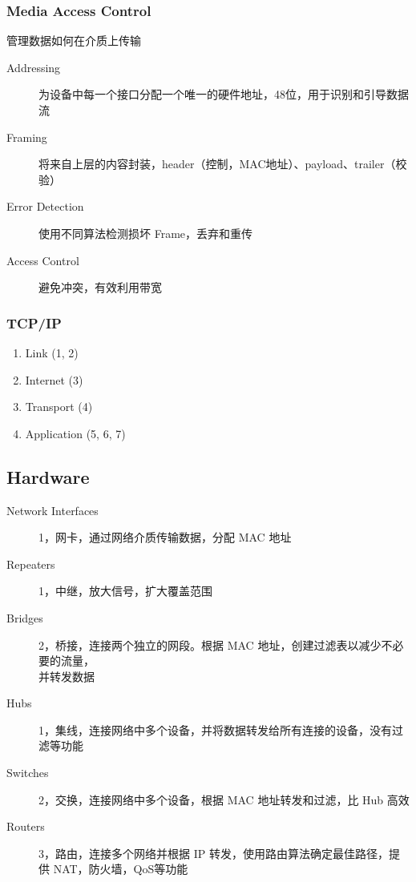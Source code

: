 \documentclass[11pt,journal,compsoc]{IEEEtran}
\begin{document}
\subsubsection{Media Access Control}

管理数据如何在介质上传输

\begin{description}
    \item[Addressing] 为设备中每一个接口分配一个唯一的硬件地址，48位，用于识别和引导数据流

    \item[Framing] 将来自上层的内容封装，header（控制，MAC地址）、payload、trailer（校验）

    \item[Error Detection] 使用不同算法检测损坏 Frame，丢弃和重传

    \item[Access Control] 避免冲突，有效利用带宽
\end{description}


\subsubsection{TCP/IP}

\begin{enumerate}
    \item Link (1, 2)
    \item Internet (3)
    \item Transport (4)
    \item Application (5, 6, 7)
\end{enumerate}


\subsection{Hardware}

\begin{description}
    \item[Network Interfaces] 1，网卡，通过网络介质传输数据，分配 MAC 地址

    \item[Repeaters] 1，中继，放大信号，扩大覆盖范围

    \item[Bridges] 2，桥接，连接两个独立的网段。根据 MAC 地址，创建过滤表以减少不必要的流量，\\ 并转发数据

    \item[Hubs] 1，集线，连接网络中多个设备，并将数据转发给所有连接的设备，没有过滤等功能

    \item[Switches] 2，交换，连接网络中多个设备，根据 MAC 地址转发和过滤，比 Hub 高效

    \item[Routers] 3，路由，连接多个网络并根据 IP 转发，使用路由算法确定最佳路径，提供 NAT，防火墙，QoS等功能
\end{description}
\end{document}
